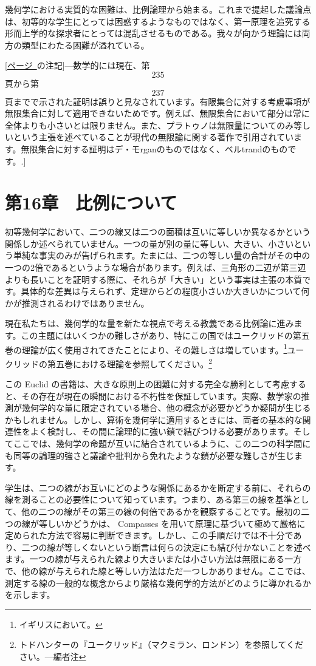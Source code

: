 \documentclass[a4paper,11pt,openany]{ltjsbook}
\newcommand{\Add}[1]{#1}
\newcommand{\Ed}{\text{Ed}}
\newcommand{\PageRef}[2][page]{\hyperref[page:#2]{#1~\pageref*{page:#2}}}
\begin{document}
幾何学における実質的な困難は、比例論理から始まる。これまで提起した議論点は、初等的な学生にとっては困惑するようなものではなく、第一原理を追究する形而上学的な探求者にとっては混乱させるものである。我々が向かう理論には両方の類型にわたる困難が溢れている。

[\PageRef[ページ]{237}の注記]---数学的には現在、第\[235\]頁から第\[237\]頁までで示された証明は誤りと見なされています。有限集合に対する考慮事項が無限集合に対して適用できないためです。例えば、無限集合において部分は常に全体よりも小さいとは限りません。\Add{}また、プラトゥノは無限量についてのみ等しいという主張を述べていることが現代の無限論に関する著作で引用されています。無限集合に対する証明はデ・モrganのものではなく、ベルtrandのものです。\Ed.]

\chapter{第16章　比例について}

初等幾何学において、二つの線又は二つの面積は互いに等しいか異なるかという関係しか述べられていません。一つの量が別の量に等しい、大きい、小さいという単純な事実のみが告げられます。たまには、二つの等しい量の合計がその中の一つの2倍であるというような場合があります。例えば、三角形の二辺が第三辺よりも長いことを証明する際に、それらが「大きい」という事実は主張の本質です。具体的な差異は与えられず、定理からどの程度小さいか大きいかについて何かが推測されるわけではありません。

現在私たちは、幾何学的な量を新たな視点で考える教義である比例論に進みます。この主題にはいくつかの難しさがあり、特にこの国ではユークリッドの第五巻の理論が広く使用されてきたことにより、その難しさは増しています。\footnote{イギリスにおいて。}ユークリッドの第五巻における理論を参照してください。\footnote{トドハンターの『ユークリッド』（マクミラン、ロンドン）を参照してください。---編者注}

この Euclid の書籍は、大きな原則上の困難に対する完全な勝利として考慮すると、その存在が現在の瞬間における不朽性を保証しています。実際、数学家の推測が幾何学的な量に限定されている場合、他の概念が必要かどうか疑問が生じるかもしれません。しかし、算術を幾何学に適用するときには、両者の基本的な関連性をよく検討し、その間に論理的に強い鎖で結びつける必要があります。そしてここでは、幾何学の命題が互いに結合されているように、この二つの科学間にも同等の論理的強さと議論や批判から免れたような鎖が必要な難しさが生じます。

学生は、二つの線がお互いにどのような関係にあるかを断定する前に、それらの線を測ることの必要性について知っています。つまり、ある第三の線を基準として、他の二つの線がその第三の線の何倍であるかを観察することです。最初の二つの線が等しいかどうかは、 Compasses を用いて原理に基づいて極めて厳格に定められた方法で容易に判断できます。しかし、この手順だけでは不十分であり、二つの線が等しくないという断言は何らの決定にも結び付かないことを述べます。一つの線が与えられた線より大きいまたは小さい方法は無限にある一方で、他の線が与えられた線と等しい方法はただ一つしかありません。ここでは、測定する線の一般的な概念からより厳格な幾何学的方法がどのように導かれるかを示します。
\end{document}
